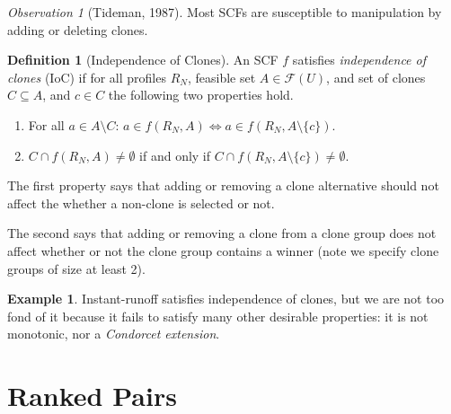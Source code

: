 \documentclass{book}
\theoremstyle{plain}
\theoremstyle{definition}
\newtheorem{definition}[theorem]{Definition}
\newtheorem{example}[theorem]{Example}
\theoremstyle{remark}
\newtheorem{observation}[theorem]{Observation}
\begin{document}
\begin{observation}[Tideman, 1987]
    Most SCFs are susceptible to manipulation by 
    adding or deleting clones.
\end{observation}

\begin{definition}[Independence of Clones]
    An SCF $f$ satisfies 
    \emph{independence of clones} (IoC)
    if for all profiles $R_N$, 
    feasible set $A \in \mathcal{F}(U)$, and set of clones $C \subseteq A$,
    and $c \in C$ the following two properties hold.

    \begin{enumerate}
        \item 
        For all $a \in A \setminus C$:
        $a \in f(R_N, A) \iff a \in f(R_N, A \setminus \{c\})$.

        \item
        $C \cap f(R_N, A) \neq \emptyset$
        if and only if 
        $C \cap f(R_N, A \setminus \{c\}) \neq \emptyset$.
    \end{enumerate}
    The first property says that 
    adding or removing a clone alternative should 
    not affect the whether a non-clone is 
    selected or not.

    The second says that adding or removing a clone from a clone
    group does not affect whether or not the clone group contains a winner 
    (note we specify clone groups of size at least 2).
\end{definition}

\begin{example}
    Instant-runoff satisfies 
    independence of clones, 
    but we are not too fond of it because it fails to satisfy 
    many other desirable properties:
    it is not monotonic, nor a \emph{Condorcet extension}.
\end{example}

\section{Ranked Pairs}
\end{document}
